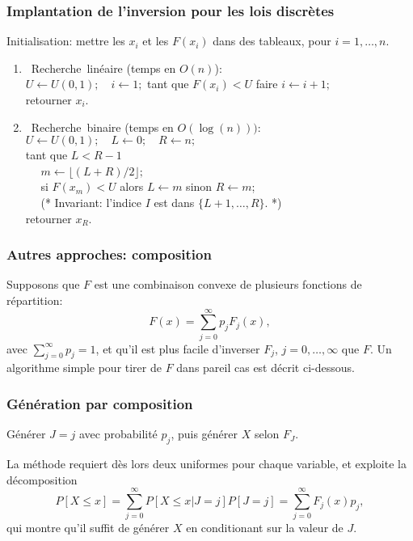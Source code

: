\documentclass[t,usepdftitle=false]{beamer}
\begin{document}
\begin{frame}
\frametitle{Implantation de l'inversion pour les lois discrètes}

{ Initialisation}: mettre les $x_i$ et les $F (x_i)$ dans des tableaux, pour $i = 1, \ldots, n$.
\begin{enumerate}
\item
\mbox{ Recherche linéaire} (temps en $O(n)$):\\
$U \leftarrow U (0, 1); \quad i \leftarrow 1;$
tant que $F (x_i) < U$ faire $i \leftarrow i + 1;$\\
retourner $x_i$.
\item
\mbox{ Recherche binaire} (temps en $O(\log(n)))$:\\
$U \leftarrow U (0, 1);\quad L \leftarrow 0;\quad R \leftarrow n;$\\
tant que $L < R - 1$\\
$\quad$ $m \leftarrow \lfloor (L + R)/2 \rfloor;$\\
$\quad$ si $F (x_m) < U$ alors $L \leftarrow m$ sinon $R \leftarrow
m$;\\
$\quad$ (* Invariant: l'indice $I$ est dans $\lbrace L + 1,\ldots, R\rbrace$. *)\\
retourner $x_R$.
\end{enumerate}


\end{frame}

\begin{frame}
\frametitle{Autres approches: composition}

Supposons que $F$ est une combinaison convexe de plusieurs fonctions de
répartition: 
\[
F (x) = \sum_{j = 0}^{\infty} p_j F_j (x),
\]
avec $\sum_{j = 0}^{\infty} p_j = 1$, et qu'il est plus facile d'inverser $F_j$, $j = 0,\ldots,\infty$ que $F$.
Un algorithme simple pour tirer de $F$ dans pareil cas est décrit ci-dessous.

\end{frame}

\begin{frame}
\frametitle{Génération par composition}

Générer $J = j$ avec probabilité $p_j$, puis générer $X$ selon $F_J$.

\mbox{}

La méthode requiert dès lors deux uniformes pour chaque variable, et exploite la décomposition
\[
P[ X \leq x ] = \sum_{j = 0}^{\infty} P[ X \leq x | J = j] P[J = j] = \sum_{j = 0}^{\infty} F_j(x)p_j, 
\]
qui montre qu'il suffit de générer $X$ en conditionant sur la valeur de $J$.

\end{frame}
\end{document}
